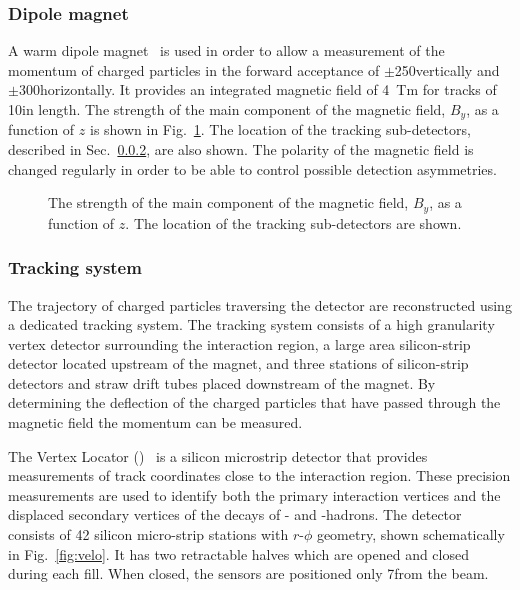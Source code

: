 \subsubsection{Dipole magnet}

A warm dipole magnet~\cite{magnet-tdr} is used in order to allow a measurement of the momentum of charged particles in the forward acceptance of $\pm$250\mrad vertically and $\pm$300\mrad horizontally. It provides an integrated magnetic field of 4~Tm for tracks of 10\m in length. The strength of the main component of the magnetic field, $B_{y}$, as a function of $z$ is shown in Fig.~\ref{fig:magnet}. The location of the tracking sub-detectors, described in Sec.~\ref{sec:lhcb:tracking}, are also shown. The polarity of the magnetic field is changed regularly in order to be able to control possible detection asymmetries.

\begin{figure}[!htb]
\centering
{}
\caption{The strength of the main component of the magnetic field, $B_{y}$, as a function of $z$. The location of the tracking sub-detectors are shown.}
\label{fig:magnet}
\end{figure}

\subsubsection{Tracking system}
\label{sec:lhcb:tracking}

The trajectory of charged particles traversing the \lhcb detector are reconstructed using a dedicated tracking system. The tracking system consists of a high granularity vertex detector surrounding the \proton\proton interaction region, a large area silicon-strip detector located upstream of the magnet, and three stations of silicon-strip detectors and straw drift tubes placed downstream of the magnet. By determining the deflection of the charged particles that have passed through the magnetic field the momentum can be measured.

The Vertex Locator (\velo)~\cite{velo-tdr,velo-perf} is a silicon microstrip detector that provides measurements of track coordinates close to the \proton\proton interaction region. These precision measurements are used to identify both the primary interaction vertices and the displaced secondary vertices of the decays of \bquark- and \cquark-hadrons. The detector consists of 42 silicon micro-strip stations with $r$-$\phi$ geometry, shown schematically in Fig.~\ref{fig:velo}. It has two retractable halves which are opened and closed during each \lhc fill. When closed, the sensors are positioned only 7\mm from the \lhc beam. 

